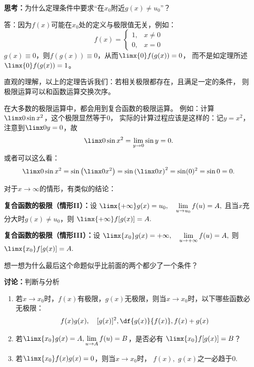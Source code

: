 \bs
{\bf 思考：}为什么定理条件中要求“在$x_0$附近$g(x)\ne u_0$”？

\bs
\ifhint
  答：因为$f(x)$可能在$x_0$处的定义与极限值无关，例如：
  $$f(x)=\left\{\begin{array}{ll}
  1,&x\ne0\\0,&x=0
  \end{array}\right.$$
  $g(x)\equiv 0$，则$f(g(x))\equiv0$，从而$\limx{0}f(g(x))=0$，
  而不是如定理所述$\limx{0}f(g(x))=1$。
\fi

直观的理解，以上的定理告诉我们：若相关极限都存在，且满足一定的条件，
则极限运算可以和函数运算交换次序。

在大多数的极限运算中，都会用到复合函数的极限运算。
例如：计算$\limx0\sin x^2$，这个极限显然等于$0$，
实际的计算过程应该是这样的：记$y=x^2$，注意到$\limx0y=0$，故
$$\limx0\sin x^2=\lim_{y\to0}\sin y=0.$$
或者可以这么看：
$$\limx0\sin x^2=\sin\left(\limx0x^2\right)
=\sin\left(\limx0x\right)^2
=\sin(0)^2=\sin0=0.$$

\bs
对于$x\to\infty$的情形，有类似的结论：
\begin{thx}
	{\bf 复合函数的极限（情形II）：}设
	$\limx{+\infty}g(x)=u_0,\quad\lim\limits_{u\to u_0}f(u)=A,$
	且当$x$充分大时$g(x)\ne u_0$，则
	$\limx{+\infty}f[g(x)]=A.$

	{\bf 复合函数的极限（情形III）：}设
	$\limx{x_0}g(x)=+\infty,\quad\lim\limits_{u\to+\infty}f(u)=A,$
	则
	$\limx{x_0}f[g(x)]=A.$
\end{thx}
想一想为什么最后这个命题似乎比前面的两个都少了一个条件？

\bs

{\bf 讨论：}判断与分析
\begin{enumerate}[(1)]
  \setlength{\itemindent}{1cm}
  \item 若$x\to x_0$时，$f(x)$有极限，$g(x)$无极限，则当$x\to x_0$时，以下哪些函数必无极限：
  $$f(x)g(x),\quad [g(x)]^2,\df{g(x)}{f(x)}, f(x)+g(x)$$ 
  \item 若$\limx{x_0}g(x)=A,\lim\limits_{u\to A}f(u)=B$，是否必有
  $\limx{x_0}f[g(x)]=B$？
  \item 若$\limx{x_0}f(x)g(x)=0$，则当$x\to
  x_0$时， $f(x),$ $g(x)$之一必趋于$0$.
\end{enumerate}

